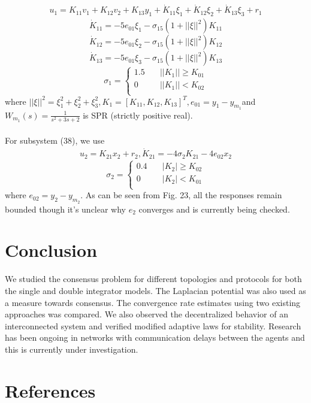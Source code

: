 \documentclass[journal]{IEEEtran}
\begin{document}
\begin{align}u_1 = K_{11}v_1+K_{12}v_2+K_{13}y_1+\dot{K}_{11}\xi_1 + \dot{K}_{12}\xi_2+\dot{K}_{13}\xi_3+r_1\end{align}$$\dot{K}_{11} = -5e_{01}\xi_1-\sigma_15(1+||\xi||^2)K_{11}$$$$\dot{K}_{12} = -5e_{01}\xi_2-\sigma_15(1+||\xi||^2)K_{12}$$$$\dot{K}_{13} = -5e_{01}\xi_3-\sigma_15(1+||\xi||^2)K_{13}$$
\[ \sigma_1 = \begin{cases} 
      1.5 \quad & ||K_1|| \geq K_{01} \\
      0 \quad &  ||K_1|| < K_{02} \\
   \end{cases}
\] 
where $||\xi||^2 = \xi^2_1+\xi^2_2+\xi^2_3, K_1 = [K_{11},K_{12},K_{13}]^T, e_{01} = y_1-y_{m_1}$and $W_{m_1}(s) = \frac{1}{s^2+3s+2}$ is SPR (strictly positive real).\\\\
For subsystem (38), we use 
\begin{align}u_2 = K_{21}x_2+r_2, \dot{K}_{21} = -4\sigma_2K_{21}-4e_{02}x_2\end{align}
\[ \sigma_2 = \begin{cases} 
      0.4 \quad & |K_2| \geq K_{02} \\
      0 \quad &  |K_2| < K_{01} \\
   \end{cases}
\] 
where $e_{02}=y_2-y_{m_2}$. As can be seen from Fig. 23, all the responses remain bounded though it's unclear why $e_2$ converges and is currently being checked. 

\section{Conclusion}

We studied the consensus problem for different topologies and protocols for both the single and double integrator models. The Laplacian potential was also used as a measure towards consensus. The convergence rate estimates using two existing approaches was compared. We also observed the decentralized  behavior of an interconnected system and verified modified adaptive laws for stability. Research has been ongoing in networks with communication delays between the agents and this is currently under investigation. 

\section{References}
\end{document}
